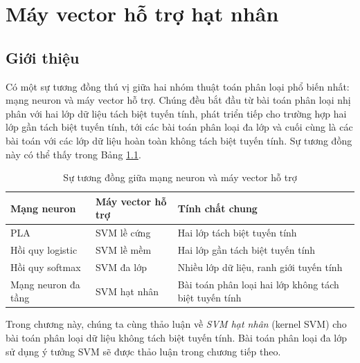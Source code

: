 \chapter{Máy vector hỗ trợ hạt nhân}
\label{cha:kernelsvm}
\section{Giới thiệu}

Có một sự tương đồng thú vị giữa hai nhóm thuật toán phân loại phổ biến nhất: mạng neuron và máy vector hỗ trợ. Chúng đều bắt đầu từ bài toán phân loại nhị phân
với hai lớp dữ liệu tách biệt tuyến tính, phát triển tiếp cho trường hợp hai lớp gần tách biệt tuyến tính, tới các bài toán phân loại đa lớp và cuối cùng là các
bài toán với các lớp dữ liệu hoàn toàn không tách biệt tuyến tính. Sự tương đồng này
có thể thấy trong Bảng \ref{tab:21_1}.


\begin{table}[h!]
\centering
\caption{Sự tương đồng giữa mạng neuron và máy vector hỗ trợ}
\label{tab:21_1}
\def\arraystretch{1.5}
\setlength\tabcolsep{5pt}
\begin{tabular}{|l|l|l|}
\hline
\textbf{Mạng neuron} & \textbf{Máy vector hỗ trợ}& \textbf{Tính chất chung} \\ \hline
PLA                 &  SVM lề cứng        & Hai lớp tách biệt tuyến tính             \\ \hline
Hồi quy logistic & SVM lề mềm    & Hai lớp gần tách biệt tuyến tính        \\ \hline
Hồi quy softmax     & SVM đa lớp   & Nhiều lớp dữ liệu, ranh giới tuyến tính              \\ \hline
Mạng neuron đa tầng & SVM hạt nhân         & Bài toán phân loại hai lớp không tách biệt tuyến tính \\ \hline
\end{tabular}
\end{table}

Trong chương này, chúng ta cùng thảo luận về \textit{SVM hạt nhân} (kernel SVM) cho bài toán phân loại dữ liệu không tách biệt tuyến tính. Bài toán phân loại đa lớp sử dụng ý tưởng SVM sẽ được thảo luận trong chương tiếp theo.

